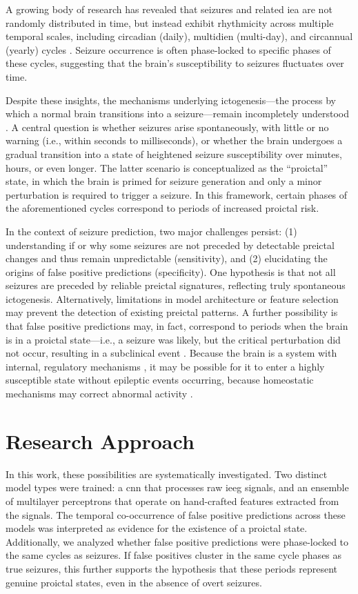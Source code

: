 A growing body of research has revealed that seizures and related \gls{iea} are not randomly distributed in time, but instead exhibit rhythmicity across multiple temporal scales, including circadian (daily), multidien (multi-day), and circannual (yearly) cycles \parencite{karoly_cycles_2021}.
Seizure occurrence is often phase-locked to specific phases of these cycles, suggesting that the brain's susceptibility to seizures fluctuates over time.

Despite these insights, the mechanisms underlying ictogenesis---the process by which a normal brain transitions into a seizure---remain incompletely understood \parencite{kuhlmann_seizure_2018}.
A central question is whether seizures arise spontaneously, with little or no warning (i.e., within seconds to milliseconds), or whether the brain undergoes a gradual transition into a state of heightened seizure susceptibility over minutes, hours, or even longer.
The latter scenario is conceptualized as the \enquote{proictal} state, in which the brain is primed for seizure generation and only a minor perturbation is required to trigger a seizure.
In this framework, certain phases of the aforementioned cycles correspond to periods of increased proictal risk.

In the context of seizure prediction, two major challenges persist: (1) understanding if or why some seizures are not preceded by detectable preictal changes and thus remain unpredictable (sensitivity), and (2) elucidating the origins of false positive predictions (specificity).
One hypothesis is that not all seizures are preceded by reliable preictal signatures, reflecting truly spontaneous ictogenesis.
Alternatively, limitations in model architecture or feature selection may prevent the detection of existing preictal patterns.
A further possibility is that false positive predictions may, in fact, correspond to periods when the brain is in a proictal state---i.e., a seizure was likely, but the critical perturbation did not occur, resulting in a subclinical event \parencite{muller_coherent_2022}.
Because the brain is a system with internal, regulatory mechanisms \parencite{buzsaki_rhythms_2006}, it may be possible for it to enter a highly susceptible state without epileptic events occurring, because homeostatic mechanisms may correct abnormal activity \parencite{freestone_forward-looking_2017}.


\section{Research Approach}
In this work, these possibilities are systematically investigated.
Two distinct model types were trained: a \gls{cnn} that processes raw \gls{ieeg} signals, and an ensemble of multilayer perceptrons that operate on hand-crafted features extracted from the signals.
The temporal co-occurrence of false positive predictions across these models was interpreted as evidence for the existence of a proictal state.
Additionally, we analyzed whether false positive predictions were phase-locked to the same cycles as seizures.
If false positives cluster in the same cycle phases as true seizures, this further supports the hypothesis that these periods represent genuine proictal states, even in the absence of overt seizures.
